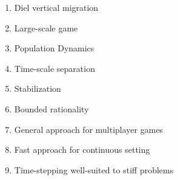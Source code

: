 \begin{enumerate}

  \item
    Diel vertical migration
  \item
   Large-scale game
  \item
   Population Dynamics
  \item
    Time-scale separation
  \item
    Stabilization
  \item
    Bounded rationality
  \item
    General approach for multiplayer games
  \item
    Fast approach for continuous setting
  \item
    Time-stepping well-suited to stiff problems

\end{enumerate}
